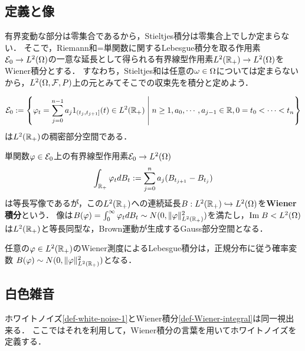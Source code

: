 \documentclass[uplatex,dvipdfmx]{jsreport}
\begin{document}
\subsection{定義と像}

\begin{tcolorbox}[colframe=ForestGreen, colback=ForestGreen!10!white,breakable,colbacktitle=ForestGreen!40!white,coltitle=black,fonttitle=\bfseries\sffamily,
title=$\Om$に関する抽象化を施して無限次元積分を定義する]
    有界変動な部分は零集合であるから，Stieltjes積分は零集合上でしか定まらない．
    そこで，Riemann和=単関数に関するLebesgue積分を取る作用素$\mathcal{E}_0\to L^2(\Omega)$の一意な延長として得られる有界線型作用素$L^2(\mathbb{R}_+)\to L^2(\Omega)$をWiener積分とする．
    すなわち，Stieltjes和は任意の$\omega\in\Omega$については定まらないから，$L^2(\Omega,\mathcal{F},P)$上の元とみてそこでの収束先を積分と定めよう．
\end{tcolorbox}

\begin{notation}
    \[\mathcal{E}_0:=\left\{\varphi_t=\sum^{n-1}_{j=0}a_j1_{(t_j,t_{j+1}]}(t)\in L^2(\mathbb{R}_+)\;\middle|\;n\ge 1,a_0,\cdots,a_{j-1}\in\mathbb{R},0=t_0<\cdots<t_n\right\}\]
    は$L^2(\mathbb{R}_+)$の稠密部分空間である．
\end{notation}

\begin{definition}\label{def-Wiener-integral}
    単関数$\varphi\in\mathcal{E}_0$上の有界線型作用素$\mathcal{E}_0\to L^2(\Omega)$
    \[\int_{\mathbb{R}_+}\varphi_tdB_t:=\sum^n_{j=0}a_j(B_{t_{j+1}}-B_{t_j})\]
    は等長写像であるが，この$L^2(\mathbb{R}_+)$への連続延長$B:L^2(\mathbb{R}_+)\hookrightarrow L^2(\Omega)$を\textbf{Wiener積分}という．
    像は$B(\varphi)=\int^\infty_0\varphi_tdB_t\sim N(0,\|\varphi\|^2_{L^2(\mathbb{R}_+)})$を満たし，$\mathrm{Im}\; B<L^2(\Omega)$は$L^2(\mathbb{R}_+)$と等長同型な，Brown運動が生成するGauss部分空間となる．
\end{definition}

\begin{lemma}
    任意の$\varphi\in L^2(\mathbb{R}_+)$のWiener測度によるLebesgue積分は，正規分布に従う確率変数
    $B(\varphi)\sim N(0,\|\varphi\|^2_{L^2(\mathbb{R}_+)})$となる．
\end{lemma}

\subsection{白色雑音}

\begin{tcolorbox}[colframe=ForestGreen, colback=ForestGreen!10!white,breakable,colbacktitle=ForestGreen!40!white,coltitle=black,fonttitle=\bfseries\sffamily,
title=]
    ホワイトノイズ\ref{def-white-noise-1}とWiener積分\ref{def-Wiener-integral}は同一視出来る．
    ここではそれを利用して，Wiener積分の言葉を用いてホワイトノイズを定義する．
\end{tcolorbox}
\end{document}
